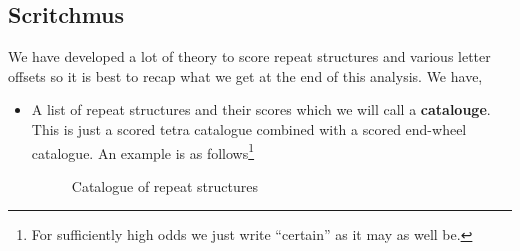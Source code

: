 \subsection{Scritchmus}
We have developed a lot of theory to score repeat structures and
various letter offsets so it is best to recap what we get at the
end of this analysis. We have,
\begin{itemize}
  \item A list of repeat structures and their scores which we will
    call a {\bf{catalouge}}. This is just a scored tetra catalogue
    combined with a scored end-wheel catalogue. An example is as
    follows\footnote{For sufficiently high odds we just write
    ``certain'' as it may as well be.}
    \begin{figure}[H]

      \begin{center}
      \end{center}
      \caption{Catalogue of repeat structures}
      \label{fig:catalogue}
    \end{figure}

\end{itemize}
